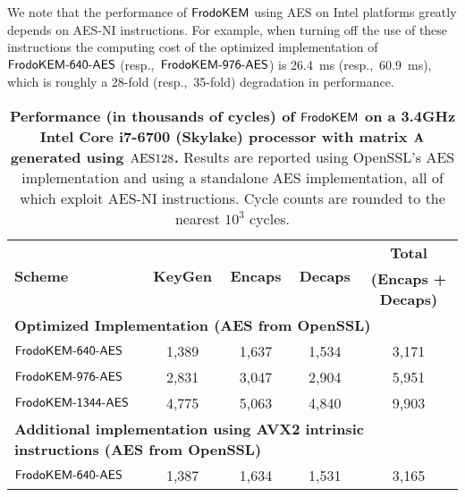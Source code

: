 \documentclass{iacrcc}
\begin{document}
We note that the performance of $\textsf{\upshape\mdseries FrodoKEM}$ using AES on Intel platforms greatly depends on AES-NI instructions. For example, when turning off the use of these instructions the computing cost of the optimized implementation of $\textsf{\upshape\mdseries FrodoKEM-640-AES}$ (resp.,~$\textsf{\upshape\mdseries FrodoKEM-976-AES}$) is 26.4~ms (resp.,~60.9~ms), which is roughly a 28-fold (resp.,~35-fold) degradation in performance.


\begin{table}[t]
\caption{\textbf{Performance (in thousands of cycles) of $\textsf{\upshape\mdseries FrodoKEM}$ on a 3.4GHz Intel Core i7-6700 (Skylake) processor with matrix $\mathbf{A}$ generated using $\textrm{\upshape\mdseries AES128}$.} Results are reported using OpenSSL's AES implementation and using a standalone AES implementation, all of which exploit AES-NI instructions. Cycle counts are rounded to the nearest $10^3$ cycles.
}\label{tab:results_x64_aes}
\medskip
\centering
\renewcommand{\tabcolsep}{0.4cm}
\renewcommand{\arraystretch}{1.1}
\begin{tabular}{l|c c c|c}
\toprule
\multirow{2}{*}{\textbf{Scheme}}     &     \multirow{2}{*}{\textbf{KeyGen}}      &    \multirow{2}{*}{\textbf{Encaps}}   &    \multirow{2}{*}{\textbf{Decaps}}   &    \textbf{Total}        \\ 
                                                       &                                                            &                                                         &                                                       &    \textbf{(Encaps + Decaps)}   \\
\midrule
\multicolumn{5}{l}{\bf Optimized Implementation (AES from OpenSSL)} \\
\midrule
$\textsf{\upshape\mdseries FrodoKEM-640-AES}$                               &            1,389                &            1,637                   &                 1,534         &                3,171             \\
$\textsf{\upshape\mdseries FrodoKEM-976-AES}$                             &            2,831                &            3,047                   &                 2,904       &                5,951             \\
$\textsf{\upshape\mdseries FrodoKEM-1344-AES}$                             &            4,775                &            5,063                   &                 4,840       &                 9,903             \\
\midrule
\multicolumn{5}{l}{\bf Additional implementation using AVX2 intrinsic instructions (AES from OpenSSL)} \\
\midrule
$\textsf{\upshape\mdseries FrodoKEM-640-AES}$                               &            1,387                &            1,634                   &                 1,531       &                3,165             \\

\end{tabular}
\end{table}
\end{document}

